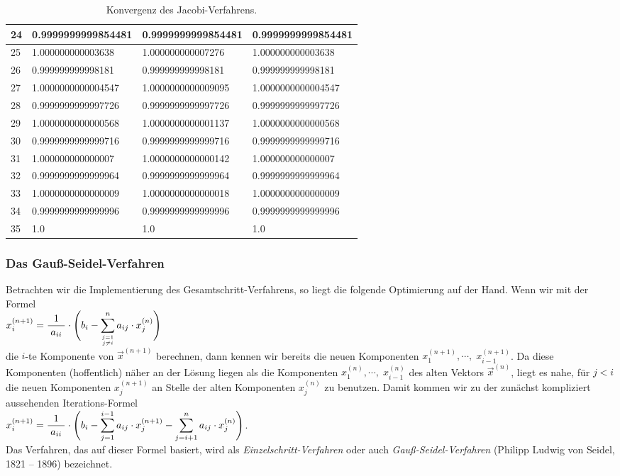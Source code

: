 \begin{table}[!h]
{\begin{tabular}{|l|l|l|l|}
\hline
24 & 0.9999999999854481 & 0.9999999999854481 & 0.9999999999854481 \\
\hline
25 & 1.000000000003638 & 1.000000000007276 & 1.000000000003638 \\
\hline
26 & 0.999999999998181 & 0.999999999998181 & 0.999999999998181 \\
\hline
27 & 1.0000000000004547 & 1.0000000000009095 & 1.0000000000004547 \\
\hline
28 & 0.9999999999997726 & 0.9999999999997726 & 0.9999999999997726 \\
\hline
29 & 1.0000000000000568 & 1.0000000000001137 & 1.0000000000000568 \\
\hline
30 & 0.9999999999999716 & 0.9999999999999716 & 0.9999999999999716 \\
\hline
31 & 1.000000000000007 & 1.0000000000000142 & 1.000000000000007 \\
\hline
32 & 0.9999999999999964 & 0.9999999999999964 & 0.9999999999999964 \\
\hline
33 & 1.0000000000000009 & 1.0000000000000018 & 1.0000000000000009 \\
\hline
34 & 0.9999999999999996 & 0.9999999999999996 & 0.9999999999999996 \\
\hline
35 & 1.0 & 1.0 & 1.0 \\
\hline
  \end{tabular}}
  \caption{Konvergenz des Jacobi-Verfahrens.}
  \label{tab:jacobi}
\end{table}




\subsubsection{Das Gau{\ss}-Seidel-Verfahren}
Betrachten wir die Implementierung des Gesamtschritt-Verfahrens, so liegt die folgende
Optimierung auf der Hand.  Wenn wir mit der Formel
\\[0.2cm]
\hspace*{1.3cm}
$x^{(n+1)}_i = \displaystyle \displaystyle\frac{\;\displaystyle1\;}{\;\displaystyle a_{ii}\;} \cdot  \Biggl( b_i - \sum\limits_{j=1 \atop j \not= i}^n a_{ij} \cdot  x^{(n)}_j \Biggr)$
\\[0.2cm]
die $i$-te Komponente von $\vec{x}^{(n+1)}$ berechnen, dann kennen wir bereits die
neuen Komponenten $x^{(n+1)}_1,\cdots,\;x^{(n+1)}_{i-1}$. Da diese Komponenten (hoffentlich) n\"aher an der
L\"osung liegen als die Komponenten $x^{(n)}_1,\cdots,\;x^{(n)}_{i-1}$ des alten Vektors
$\vec{x}^{(n)}$, liegt es nahe, f\"ur $j<i$ die neuen Komponenten $x_j^{(n+1)}$ an Stelle
der alten Komponenten $x_j^{(n)}$ zu benutzen.  Damit kommen
wir zu der zun\"achst kompliziert aussehenden Iterations-Formel 
\\[0.2cm]
\hspace*{1.3cm}
$x^{(n+1)}_i = \displaystyle \displaystyle\frac{\;\displaystyle1\;}{\;\displaystyle a_{ii}\;} \cdot  \Biggl( b_i - \sum\limits_{j=1}^{i-1} a_{ij} \cdot  x^{(n+1)}_j -
               \sum\limits_{j=i+1}^n a_{ij} \cdot  x^{(n)}_j \Biggr)$.
\\[0.2cm]
Das Verfahren, das auf dieser Formel basiert, wird als \emph{Einzelschritt-Verfahren} oder
auch \emph{Gau{\ss}-Seidel-Verfahren} (Philipp Ludwig von Seidel, 1821 -- 1896) bezeichnet.

